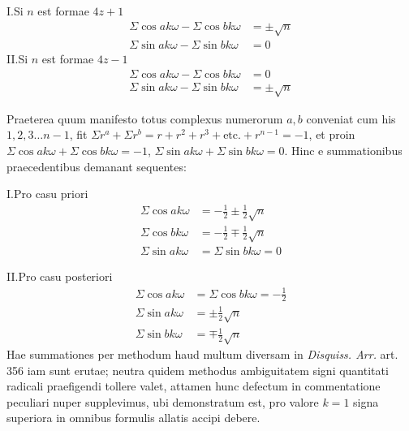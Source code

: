 \noindent I.\quad Si $n$ est formae $4z+1$
\[
\begin{aligned}
\Sigma\cos ak\omega-\Sigma\cos bk\omega&=\pm\surd n\\
\Sigma\sin ak\omega-\Sigma\sin bk\omega&=0
\end{aligned}
\]
\noindent II.\quad Si $n$ est formae $4z-1$
\[
\begin{aligned}
\Sigma\cos ak\omega-\Sigma\cos bk\omega&=0\\
\Sigma\sin ak\omega-\Sigma\sin bk\omega&=\pm\surd n
\end{aligned}
\]

Praeterea quum manifesto totus complexus numerorum $a,b$ conveniat cum his $1,2,3\dots n-1$, fit $\Sigma r^a+\Sigma r^b=r+r^2+r^3+\text{etc.}+r^{n-1}=-1$, et proin $\Sigma\cos ak\omega+\Sigma\cos bk\omega=-1$, $\Sigma\sin ak\omega+\Sigma\sin bk\omega=0$. Hinc e summationibus praecedentibus demanant sequentes:

\noindent I.\quad Pro casu priori
\[
\begin{aligned}
\Sigma\cos ak\omega&=-\tfrac12\pm\tfrac12\surd n\\
\Sigma\cos bk\omega&=-\tfrac12\mp\tfrac12\surd n\\
\Sigma\sin ak\omega&=\Sigma\sin bk\omega=0
\end{aligned}
\]

%
\noindent II.\quad Pro casu posteriori
\[
\begin{aligned}
\Sigma\cos ak\omega&=\Sigma\cos bk\omega=-\tfrac12\\
\Sigma\sin ak\omega&=\pm\tfrac12\surd n\\
\Sigma\sin bk\omega&=\mp\tfrac12\surd n
\end{aligned}
\]
Hae summationes per methodum haud multum diversam in \emph{Disquiss. Arr.} art. 356 iam sunt erutae; neutra quidem methodus ambiguitatem signi quantitati radicali praefigendi tollere valet, attamen hunc defectum in commentatione peculiari nuper supplevimus, ubi demonstratum est, pro valore $k=1$ signa superiora in omnibus formulis allatis accipi debere.

